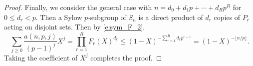 \documentclass[11pt]{amsart}
\numberwithin{equation}{section}
\newtheorem{lemma}[theorem]{Lemma}
\theoremstyle{definition}
\theoremstyle{remark}
\begin{document}
\begin{proof}
    Finally, we consider the general case with $n = d_0+d_1p +\cdots +d_Rp^R$ for $0\leqslant d_r < p$. Then a Sylow $p$-subgroup of $S_n$ is a direct product of $d_r$ copies
    of $P_r$ acting on disjoint sets.
    Then by \eqref{e:sym_F_2},
    \begin{equation*}
        \sum_{j\geqslant 0}\frac{a(n,p,j)}{(p-1)^j}X^j = \prod_{r = 1}^RF_r(X)^{d_r} \leqslant (1-X)^{-\sum_{r=1}^Rd_rp^{r-1}} = (1-X)^{-\lfloor n/p\rfloor}.
    \end{equation*}
    Taking the coefficient of $X^j$ completes the proof.
\end{proof}

\end{document}
